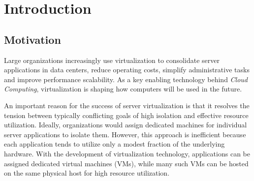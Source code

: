 \chapter{Introduction}
\section{Motivation}
Large organizations increasingly use virtualization to consolidate server
applications in data centers, reduce operating costs, simplify administrative
tasks and improve performance scalability. As a key 
enabling technology behind {\em Cloud Computing}, virtualization
is shaping how computers will be used in the future.

An important reason for the success of server virtualization 
is that it resolves the tension between typically conflicting
goals of high isolation and effective resource utilization.
Ideally, organizations would assign dedicated
machines for individual server applications
to isolate them. 
However, this approach is inefficient
because each application tends to utilize only a modest fraction of 
the underlying hardware.
With the development of virtualization technology, applications
can be assigned dedicated virtual machines (VMs),
while many such VMs can be hosted on the same physical
host for high resource utilization.

